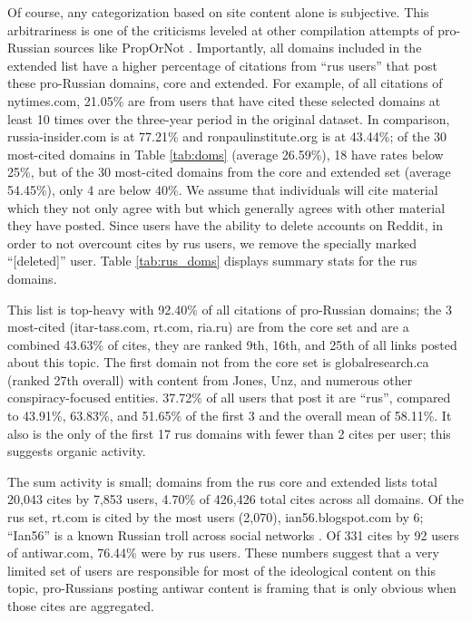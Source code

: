 Of course, any categorization based on site content alone is subjective.
This arbitrariness is one of the criticisms leveled at other compilation attempts of pro-Russian sources like PropOrNot \cite{chen2016}.
Importantly, all domains included in the extended list have a higher percentage of citations from ``rus users'' that post these pro-Russian domains, core and extended.
For example, of all citations of nytimes.com, 21.05\% are from users that have cited these selected domains at least 10 times over the three-year period in the original dataset.
In comparison, russia-insider.com is at 77.21\% and ronpaulinstitute.org is at 43.44\%; of the 30 most-cited domains in Table \ref{tab:doms} (average 26.59\%), 18 have rates below 25\%, but of the 30 most-cited domains from the core and extended set (average 54.45\%), only 4 are below 40\%.
We assume that individuals will cite material which they not only agree with but which generally agrees with other material they have posted.
Since users have the ability to delete accounts on Reddit, in order to not overcount cites by rus users, we remove the specially marked ``[deleted]'' user.
Table \ref{tab:rus_doms} displays summary stats for the rus domains.

This list is top-heavy with 92.40\% of all citations of pro-Russian domains; the 3 most-cited (itar-tass.com, rt.com, ria.ru) are from the core set and are a combined 43.63\% of cites, they are ranked 9th, 16th, and 25th of all links posted about this topic.
The first domain not from the core set is globalresearch.ca (ranked 27th overall) with content from Jones, Unz, and numerous other conspiracy-focused entities.
37.72\% of all users that post it are ``rus'', compared to 43.91\%, 63.83\%, and 51.65\% of the first 3 and the overall mean of 58.11\%.
It also is the only of the first 17 rus domains with fewer than 2 cites per user; this suggests organic activity.

The sum activity is small; domains from the rus core and extended lists total 
20,043 cites by 7,853 users, 4.70\% of 426,426 total cites across all domains.
Of the rus set, rt.com is cited by the most users (2,070), ian56.blogspot.com by 6; ``Ian56'' is a known Russian troll across social networks \cite[p. 278]{heffer2020}.
Of 331 cites by 92 users of antiwar.com, 76.44\% were by rus users.
These numbers suggest that a very limited set of users are responsible for most of the ideological content on this topic, pro-Russians posting antiwar content is framing that is only obvious when those cites are aggregated.

